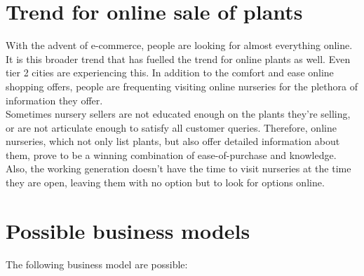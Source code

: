 \documentclass{article}
\begin{document}
\section*{Trend for online sale of plants}

With the advent of e-commerce, people are looking for almost everything online. It is this broader trend that has fuelled the trend for online plants as well. Even tier 2 cities are experiencing this. In addition to the comfort and ease online shopping offers, people are frequenting visiting online nurseries for the plethora of information they offer.\\

Sometimes nursery sellers are not educated enough on the plants they're selling, or are not articulate enough to satisfy all customer queries. Therefore, online nurseries, which not only list plants, but also offer detailed information about them, prove to be a winning combination of ease-of-purchase and knowledge. Also, the working generation doesn't have the time to visit nurseries at the time they are open, leaving them with no option but to look for options online.\\

\section*{Possible business models}

The following business model are possible:
\end{document}
